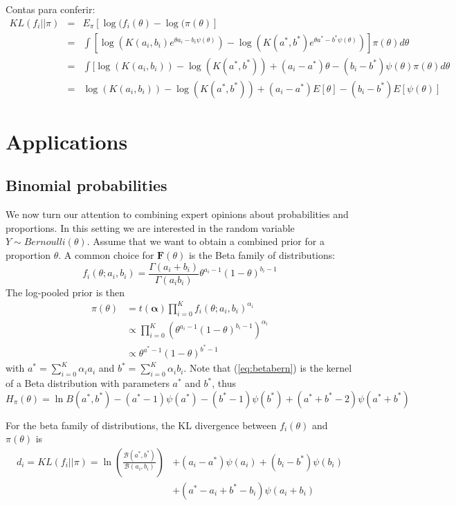\documentclass[a4paper, notitlepage, 11pt]{article}
\begin{document}
Contas para conferir:
\begin{eqnarray*} 
KL(f_i || \pi) & = & E_\pi[\log(f_i(\theta)-\log(\pi(\theta)] \\
              & = & \int [\log( K(a_i,b_i) e^{\theta a_i - b_i \psi(\theta)}) - \log(K(a^*,b^*) e^{\theta a^* - b^* \psi(\theta)}) ] \pi(\theta) d\theta \\
              & = & \int [\log( K(a_i,b_i)) - \log(K(a^*,b^*)) + (a_i - a^*) \theta  - (b_i - b^*) \psi(\theta) \pi(\theta) d\theta \\
              & = & \log( K(a_i,b_i)) - \log(K(a^*,b^*)) + (a_i - a^*) E[\theta] - (b_i - b^*) E[\psi(\theta)] 
\end{eqnarray*}


\section*{Applications}
\label{sec:apps}

\subsection*{Binomial probabilities}
\label{sec:beta}
We now turn our attention to combining expert opinions about probabilities and proportions.
In this setting we are interested in the random variable $Y\sim Bernoulli(\theta)$.
Assume that we want to obtain a combined prior for a proportion $\theta$.
A common choice for $\mathbf{F}(\theta)$ is the Beta family of distributions:
$$f_i(\theta;a_i, b_i) = \frac{\Gamma(a_i + b_i)}{\Gamma(a_i b_i)} \theta^{a_i-1}(1-\theta)^{b_i-1}$$
The log-pooled prior is then
\begin{align}
\pi(\theta)&= t(\boldsymbol\alpha)\prod_{i=0}^{K}f_i(\theta;a_i,b_i)^{\alpha_i}\\
&\propto \prod_{i=0}^{K} \left(\theta^{a_i-1}(1-\theta)^{b_i-1} \right)^{\alpha_i}\\
\label{eq:betabern}
&\propto \theta^{a^*-1}(1-\theta)^{b^*-1}
\end{align}
with $a^* =\sum_{i=0}^{K}\alpha_ia_i$ and $b^* = \sum_{i=0}^{K}\alpha_ib_i$.
Note that (\ref{eq:betabern}) is the kernel of a Beta distribution with parameters $a^*$ and $b^*$, thus 
\begin{equation}
 \label{eq:entropybeta}
 H_{\pi}(\theta) = \ln B(a^*,b^*) - (a^*-1)\psi(a^*) - (b^*-1)\psi(b^*) + (a^*+b^* -2)\psi(a^*+b^*)
\end{equation}

For the beta family of distributions, the KL divergence between $f_i(\theta)$ and $\pi(\theta)$ is
\begin{equation}
\begin{split}
 \label{eq:KLbeta}
 d_i = KL(f_i||\pi) = \ln\left(\frac{\mathcal{B}(a^*, b^*)}{\mathcal{B}(a_i, 
b_i)}\right) &+ (a_i-a^*)\psi(a_i)+ (b_i-b^*)\psi(b_i) \\
 &+ (a^*-a_i + b^* - b_i)\psi(a_i+b_i)
\end{split}
 \end{equation}
\end{document}
